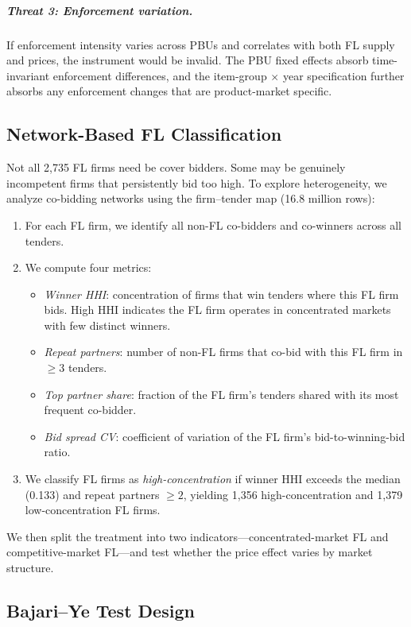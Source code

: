 \subparagraph{Threat 3: Enforcement variation.}
If enforcement intensity varies across PBUs and correlates with both FL
supply and prices, the instrument would be invalid. The PBU fixed effects
absorb time-invariant enforcement differences, and the item-group
$\times$ year specification further absorbs any enforcement changes that
are product-market specific.

\subsection{Network-Based FL Classification}
\label{sec:empirical_network}

Not all 2,735 FL firms need be cover bidders. Some may be genuinely
incompetent firms that persistently bid too high. To explore
heterogeneity, we analyze co-bidding networks using the firm--tender map
(16.8 million rows):

\begin{enumerate}
  \item For each FL firm, we identify all non-FL co-bidders and
    co-winners across all tenders.
  \item We compute four metrics:
    \begin{itemize}
      \item \emph{Winner HHI}: concentration of firms that win tenders
        where this FL firm bids. High HHI indicates the FL firm operates
        in concentrated markets with few distinct winners.
      \item \emph{Repeat partners}: number of non-FL firms that co-bid
        with this FL firm in $\geq 3$ tenders.
      \item \emph{Top partner share}: fraction of the FL firm's tenders
        shared with its most frequent co-bidder.
      \item \emph{Bid spread CV}: coefficient of variation of the FL
        firm's bid-to-winning-bid ratio.
    \end{itemize}
  \item We classify FL firms as \emph{high-concentration} if winner HHI
    exceeds the median (0.133) and repeat partners $\geq 2$, yielding
    1,356 high-concentration and 1,379 low-concentration FL firms.
\end{enumerate}

We then split the treatment into two indicators---concentrated-market FL
and competitive-market FL---and test whether the price effect varies by
market structure.

\subsection{Bajari--Ye Test Design}
\label{sec:empirical_bajari}

